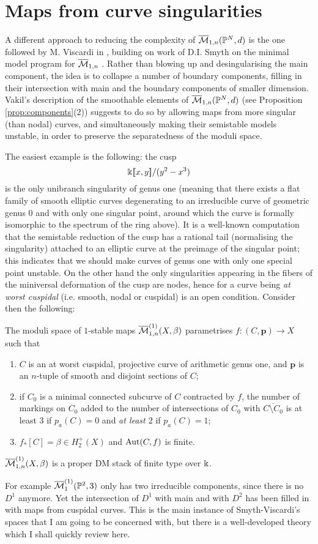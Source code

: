\section{Maps from curve singularities}
A different approach to reducing the complexity of $\overline{\mathcal{M}}_{1,n}(\mathbb P^N,d)$ is the one followed by M. Viscardi in \cite{VISC}, building on work of D.I. Smyth on the minimal model program for $\overline{\mathcal{M}}_{1,n}$ \cite{SMY1}. Rather than blowing up and desingularising the main component, the idea is to collapse a number of boundary components, filling in their intersection with main and the boundary components of smaller dimension. Vakil's description of the smoothable elements of $\overline{\mathcal{M}}_{1,n}(\mathbb P^N,d)$ (see Proposition \ref{prop:components}(2)) suggests to do so by allowing maps from more singular (than nodal) curves, and simultaneously making their semistable models unstable, in order to preserve the separatedness of the moduli space.

The easiest example is the following: the cusp
\[\Bbbk[\![x,y]\!]/(y^2-x^3)\]
is the only unibranch singularity of genus one (meaning that there exists a flat family of smooth elliptic curves degenerating to an irreducible curve of geometric genus $0$ and with only one singular point, around which the curve is formally isomorphic to the spectrum of the ring above). It is a well-known computation \cite[\S 3.C]{HM} that the semistable reduction of the cusp has a rational tail (normalising the singularity) attached to an elliptic curve at the preimage of the singular point; this indicates that we should make curves of genus one with only one special point unstable. On the other hand the only singularities appearing in the fibers of the miniversal deformation of the cusp are nodes, hence for a curve being \emph{at worst cuspidal} (i.e. smooth, nodal or cuspidal) is an open condition. Consider then the following:
\begin{dfn}
 The moduli space of $1$-stable maps $\overline{\mathcal M}^{(1)}_{1,n}(X,\beta)$ parametrises $f\colon (C,\mathbf p)\to X$ such that
 \begin{enumerate}
  \item $C$ is an at worst cuspidal, projective curve of arithmetic genus one, and $\mathbf p$ is an $n$-tuple of smooth and disjoint sections of $C$;
  \item if $C_0$ is a minimal connected subcurve of $C$ contracted by $f$, the number of markings on $C_0$ added to the number of intersections of $C_0$ with $\overline{C\setminus C_0}$ is at least $3$ if $p_a(C)=0$ and \emph{at least $2$} if $p_a(C)=1$;
  \item $f_*[C]=\beta\in H^+_2(X)$ and $\operatorname{Aut}(C,f)$ is finite.
 \end{enumerate}
\end{dfn}
\begin{lemma}
 $\overline{\mathcal M}^{(1)}_{1,n}(X,\beta)$ is a proper DM stack of finite type over $\Bbbk$.
\end{lemma}
For example $\overline{\mathcal{M}}^{(1)}_1(\mathbb P^2,3)$ only has two irreducible components, since there is no $D^1$ anymore. Yet the intersection of $D^1$ with main and with $D^2$ has been filled in with maps from cuspidal curves. This is the main instance of Smyth-Viscardi's spaces that I am going to be concerned with, but there is a well-developed theory which I shall quickly review here.
